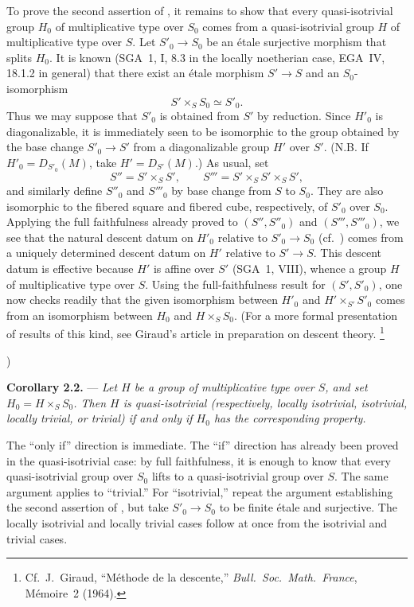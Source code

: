 To prove the second assertion of , it remains to show that every
quasi-isotrivial group \(H_0\) of multiplicative type over \(S_0\)
comes from a quasi-isotrivial group \(H\) of multiplicative type over
\(S\). Let \(S'_0\to S_0\) be an étale surjective morphism that splits
\(H_0\). It is known (SGA~1, I, 8.3 in the locally noetherian case,
EGA~IV, 18.1.2 in general) that there exist an étale morphism
\(S'\to S\) and an \(S_0\)-isomorphism
\[
  S'\times_S S_0\simeq S'_0.
\]
Thus we may suppose that \(S'_0\) is obtained from \(S'\) by
reduction. Since \(H'_0\) is diagonalizable, it is immediately seen
to be isomorphic to the group obtained by the base change
\(S'_0\to S'\) from a diagonalizable group \(H'\) over \(S'\). (N.B.
If \(H'_0=D_{S'_0}(M)\), take \(H'=D_{S'}(M)\).) As usual, set
\[
  S''=S'\times_S S',
  \qquad
  S'''=S'\times_S S'\times_S S',
\]
and similarly define \(S''_0\) and \(S'''_0\) by base change from
\(S\) to \(S_0\). They are also isomorphic to the fibered square and
fibered cube, respectively, of \(S'_0\) over \(S_0\). Applying the
full faithfulness already proved to \((S'',S''_0)\) and
\((S''',S'''_0)\), we see that the natural descent datum on \(H'_0\)
relative to \(S'_0\to S_0\) (cf.\ ) comes from a uniquely
determined descent datum on \(H'\) relative to \(S'\to S\). This
descent datum is effective because \(H'\) is affine over \(S'\)
(SGA~1, VIII), whence a group \(H\) of multiplicative type over \(S\).
Using the full-faithfulness result for \((S',S'_0)\), one now checks
readily that the given isomorphism between \(H'_0\) and
\(H'\times_{S'}S'_0\) comes from an isomorphism between \(H_0\) and
\(H\times_S S_0\). (For a more formal presentation of results of this
kind, see Giraud's article in preparation on descent theory.%
\begingroup
\renewcommand{\thefootnote}{\(\ast\)}%
\footnote{Cf.\ J.~Giraud, ``Méthode de la descente,'' \emph{Bull.\
Soc.\ Math.\ France}, Mémoire~2 (1964).}%
\endgroup
\addtocounter{footnote}{-1})

\medskip
\noindent{}%
\textbf{Corollary 2.2.} ---
\textit{Let \(H\) be a group of multiplicative type over \(S\), and set
\(H_0=H\times_S S_0\). Then \(H\) is quasi-isotrivial (respectively,
locally isotrivial, isotrivial, locally trivial, or trivial) if and
only if \(H_0\) has the corresponding property.}

The ``only if'' direction is immediate. The ``if'' direction has
already been proved in the quasi-isotrivial case: by full
faithfulness, it is enough to know that every quasi-isotrivial group
over \(S_0\) lifts to a quasi-isotrivial group over \(S\). The same
argument applies to ``trivial.'' For ``isotrivial,'' repeat the
argument establishing the second assertion of , but take
\(S'_0\to S_0\) to be finite étale and surjective. The locally
isotrivial and locally trivial cases follow at once from the
isotrivial and trivial cases.


